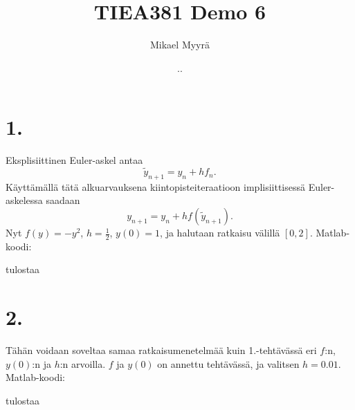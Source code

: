 \documentclass{article}
\title{TIEA381 Demo 6}
\author{Mikael Myyrä}
\date{\number\day.\number\month.\number\year}
\begin{document}
\maketitle

\section*{1.}

Eksplisiittinen Euler-askel antaa
\[
  \tilde{y}_{n+1} = y_n + hf_n.
\]
Käyttämällä tätä alkuarvauksena kiintopisteiteraatioon implisiittisessä
Euler-askelessa saadaan
\[
  y_{n+1} = y_n + hf(\tilde{y}_{n+1}).
\]
Nyt $f(y) = -y^2$, $h = \frac{1}{2}$, $y(0) = 1$, ja halutaan ratkaisu välillä $[0,2]$.
Matlab-koodi:



tulostaa




\section*{2.}

Tähän voidaan soveltaa samaa ratkaisumenetelmää kuin 1.-tehtävässä
eri $f$:n, $y(0)$:n ja $h$:n arvoilla. $f$ ja $y(0)$ on annettu tehtävässä,
ja valitsen $h = 0.01$. Matlab-koodi:



tulostaa


\end{document}
